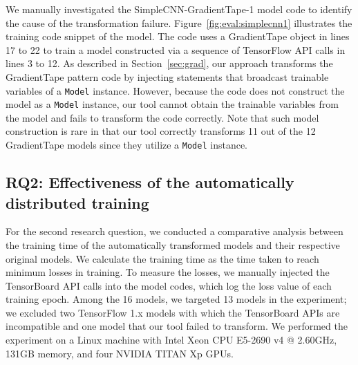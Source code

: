 We manually investigated the SimpleCNN-GradientTape-1 model code to 
identify the cause of the transformation failure.
Figure~\ref{fig:eval:simplecnn1} illustrates the training code snippet of the
model.
The code uses a GradientTape object in lines 17 to 22 to train a model
constructed via a sequence of TensorFlow API calls in lines 3 to 12.
As described in Section~\ref{sec:grad}, our approach transforms the
GradientTape pattern code by injecting statements that broadcast trainable
variables of a {\tt Model} instance.
However, because the code does not construct the model as a {\tt Model}
instance, our tool cannot obtain the trainable variables from the model and
fails to transform the code correctly.
Note that such model construction is rare in that our tool correctly transforms
11 out of the 12 GradientTape models since they utilize a {\tt Model}
instance.


\subsection{RQ2: Effectiveness of the automatically distributed training}
For the second research question, we conducted a comparative analysis
between the training time of the automatically transformed models and their
respective original models.
We calculate the training time as the time taken to reach minimum losses in
training.
To measure the losses, we manually injected the TensorBoard\cite{tensorboard}
API calls into the model codes, which log the loss value of each training
epoch.
Among the 16 models, we targeted 13 models in the experiment; we excluded two
TensorFlow 1.x models with which the TensorBoard APIs are incompatible 
and one model that our tool failed to transform.
We performed the experiment on a Linux machine with Intel Xeon CPU E5-2690 v4 @
2.60GHz, 131GB memory, and four NVIDIA TITAN Xp GPUs.




